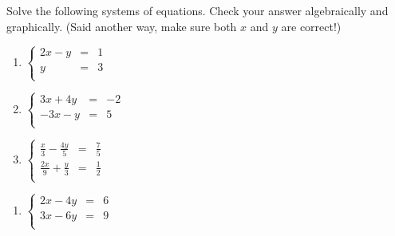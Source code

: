 \documentclass{ximera}
\begin{document}
\begin{ex} \label{reviewsubelim}  Solve the following systems of equations.  Check your answer algebraically and graphically.  (Said another way, make sure both $x$ and $y$ are correct!)

\begin{multicols}{3}
\begin{enumerate}

\item  $\left\{ \begin{array}{rcr} 2x - y & = & 1 \\ y & = & 3 \\ \end{array} \right.$ 

\item  $\left\{ \begin{array}{rcr} 3x+4y & = & -2  \\ -3x-y & = & 5 \\ \end{array} \right.$ 

\item  $\left\{ \begin{array}{rcr} \frac{x}{3} -\frac{4y}{5} & = & \frac{7}{5} \\ [3pt] 
\frac{2x}{9} + \frac{y}{3} & = & \frac{1}{2} \\ \end{array} \right.$

\setcounter{HW}{\value{enumi}}
\end{enumerate}
\end{multicols}

\begin{multicols}{3}
\begin{enumerate}
\setcounter{enumi}{\value{HW}}

\item  $\left\{ \begin{array}{rcr} 2x - 4y & = & 6 \\ 3x -6y & = & 9\\ \end{array} \right.$ 


\end{enumerate}
\end{multicols}
\end{ex}
\end{document}
